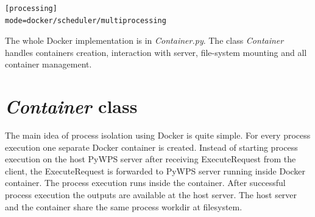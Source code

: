 \documentclass[12pt,a4paper]{article}
\begin{document}
\bigskip
\begin{lstlisting}[basicstyle=\small,caption={Processing mode configuration},language=XML,label={lst:Mode_config}]
[processing]
mode=docker/scheduler/multiprocessing
\end{lstlisting}

\begin{figure}[h!]
\centering
\begin{floatrow}
\end{floatrow}
\end{figure}

\bigskip
The whole Docker implementation is in \textit{Container.py}. The class \textit{Container} handles containers creation, interaction with
server, file-system mounting and all container management.

\newpage
\section{\textit{Container} class}
The main idea of process isolation using Docker is quite simple. For every process execution one separate Docker container is created.
Instead of starting process execution on the host PyWPS server after receiving ExecuteRequest from the client, the ExecuteRequest is
forwarded to PyWPS server running inside Docker container. The process execution runs inside the container. After successful process
execution the outputs are available at the host server. The host server and the container share the same process workdir at filesystem.
\end{document}
